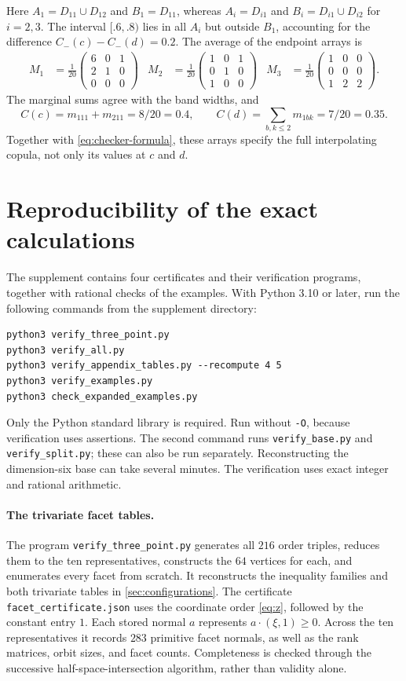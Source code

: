 \documentclass[a4paper,11pt]{amsart}
\numberwithin{equation}{section}
\theoremstyle{definition}
\theoremstyle{remark}
\newcommand{\mat}[1]{\begin{pmatrix}#1\end{pmatrix}}
\begin{document}
Here $A_1=D_{11}\cup D_{12}$ and $B_1=D_{11}$, whereas
$A_i=D_{i1}$ and $B_i=D_{i1}\cup D_{i2}$ for $i=2,3$.
The interval $[.6,.8)$ lies in all $A_i$ but outside $B_1$, accounting
for the difference $C_-(c)-C_-(d)=0.2$.
The average of the endpoint arrays is
\[\begin{aligned}
M_1&=\frac1{20}\mat{6&0&1\\2&1&0\\0&0&0}&
M_2&=\frac1{20}\mat{1&0&1\\0&1&0\\1&0&0}&
M_3&=\frac1{20}\mat{1&0&0\\0&0&0\\1&2&2}.
\end{aligned}\]
The marginal sums agree with the band widths, and
\[
 C(c)=m_{111}+m_{211}=8/20=0.4,\qquad
 C(d)=\sum_{b,k\leq2}m_{1bk}=7/20=0.35.
\]
Together with \eqref{eq:checker-formula}, these arrays specify the full
interpolating copula, not only its values at $c$ and $d$.


\section{Reproducibility of the exact calculations}\label{app:verification}
The supplement contains four certificates and their verification programs,
together with rational checks of the examples. With Python 3.10 or later,
run the following commands from the supplement directory:
\begin{verbatim}
python3 verify_three_point.py
python3 verify_all.py
python3 verify_appendix_tables.py --recompute 4 5
python3 verify_examples.py
python3 check_expanded_examples.py
\end{verbatim}
Only the Python standard library is required. Run without \texttt{-O},
because verification uses assertions. The second command runs
\texttt{verify\_base.py} and \texttt{verify\_split.py}; these can also be
run separately. Reconstructing the dimension-six base can take several
minutes. The verification uses exact integer and rational arithmetic.

\paragraph{The trivariate facet tables.}
The program \texttt{verify\_three\_point.py} generates all $216$ order
triples, reduces them to the ten representatives, constructs the $64$
vertices for each, and enumerates every facet from scratch. It reconstructs
the inequality families and both trivariate tables in
\cref{sec:configurations}. The certificate
\texttt{facet\_certificate.json} uses the coordinate order \eqref{eq:z},
followed by the constant entry $1$. Each stored normal $a$ represents
$a\cdot(\xi,1)\geq0$. Across the ten representatives it records $283$
primitive facet normals, as well as the rank matrices, orbit sizes, and
facet counts. Completeness is checked through the successive
half-space-intersection algorithm, rather than validity alone.
\end{document}

